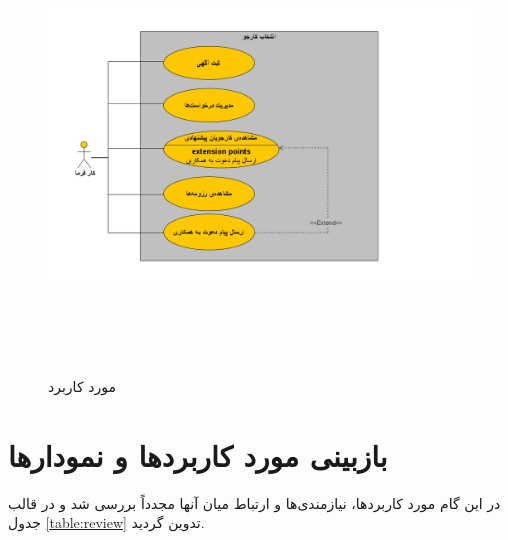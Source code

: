 \begin{figure}[H]
	\caption{مورد کاربرد }
	\begin{center}
		\includegraphics[width=\textwidth, height=12cm]{./images/5}
	\end{center}
\end{figure}

\section{بازبینی مورد کاربرد‌ها و نمودارها}		
در این گام مورد کاربرد‌ها، نیازمندی‌ها و ارتباط میان‌ آنها مجدداً بررسی شد و در قالب جدول \ref{table:review} تدوین گردید.

